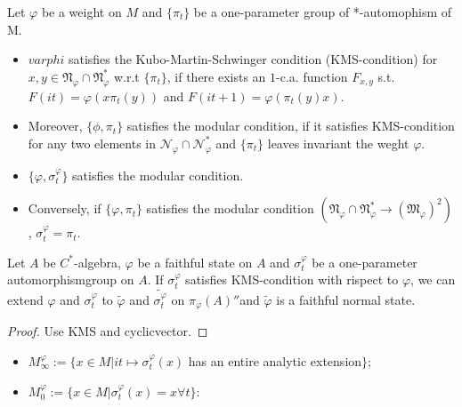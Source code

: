\begin{definition}
  Let $\varphi$ be a weight on $M$ and $\{\pi_t\}$ be a one-parameter group of *-automophism of M. \\
  \begin{itemize}
    \item $varphi$ satisfies the Kubo-Martin-Schwinger condition (KMS-condition) for $x,y \in \mathfrak{N}_\varphi \cap \mathfrak{N}_\varphi^*$ w.r.t $\{\pi_t\}$, if there exists an $1$-c.a. function $F_{x,y}$ s.t. $F(it) = \varphi(x\pi_t(y))$ and $F(it + 1)= \varphi(\pi_t(y)x)$.
    \item Moreover, $\{\phi,\pi_t\}$ satisfies the modular condition, if it satisfies KMS-condition for any two elements in $\mathcal{N}_\varphi \cap \mathcal{N}_\varphi^*$ and $\{\pi_t\}$ leaves invariant the weght $\varphi$.
  \end{itemize}
\end{definition}

\begin{theorem}
  \begin{itemize}
    \item $\{\varphi, \sigma_t^\varphi\}$ satisfies the modular condition.
    \item Conversely, if $\{\varphi, \pi_t\}$ satisfies the modular condition $(\mathfrak{N}_\varphi \cap \mathfrak{N}_\varphi^* \rightarrow (\mathfrak{M}_\varphi)^2)$, $\sigma_t^\varphi = \pi_t$.
  \end{itemize}
\end{theorem}


\begin{theorem}
  Let $A$ be $C^*$-algebra, $\varphi$ be a faithful state on $A$ and $\sigma_t^{\varphi}$ be a one-parameter automorphismgroup on $A$.
  If $\sigma_t^{\varphi}$ satisfies KMS-condition with rispect to $\varphi$,
  we can extend $\varphi$ and $\sigma_t^{\varphi}$ to $\tilde{\varphi}$ and $\tilde{\sigma_t^{\varphi}}$ on $\pi_{\varphi}(A)''$and $\tilde{\varphi}$ is a faithful normal state.
\end{theorem}

\begin{proof}
  Use KMS and cyclicvector.
\end{proof}

\begin{definition}
  \begin{itemize}
    \item $M_\infty^\varphi := \{ x \in M | it \mapsto \sigma_t^\varphi(x) $ has an entire analytic extension$\}$;
    \item $M_0^\varphi := \{x \in M | \sigma_t^\varphi(x)=x \forall t \}$:
  \end{itemize}
\end{definition}

